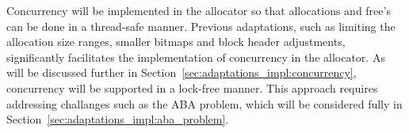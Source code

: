 Concurrency will be implemented in the allocator so that allocations and free's can be done in a thread-safe manner. Previous adaptations, such as limiting the allocation size ranges, smaller bitmaps and block header adjustments, significantly facilitates the implementation of concurrency in the allocator. As will be discussed further in Section~\ref{sec:adaptations_impl:concurrency}, concurrency will be supported in a lock-free manner. This approach requires addressing challanges such as the ABA problem, which will be considered fully in Section~\ref{sec:adaptations_impl:aba_problem}.

